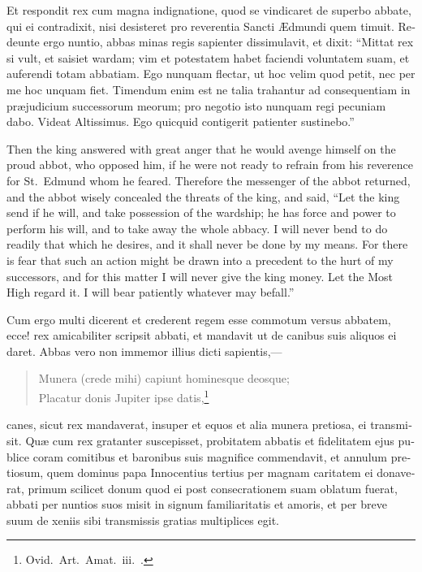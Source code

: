 \documentclass[10pt]{book}
\begin{document}
\begin{paracol}{2}
\switchcolumn*

\begin{otherlanguage}{latin}
Et respondit rex cum magna indignatione, quod se vindicaret de superbo abbate, qui ei contradixit, nisi desisteret pro reverentia Sancti \AE{}dmundi quem timuit. Redeunte ergo nuntio, abbas minas regis sapienter dissimulavit, et dixit: ``Mittat rex si vult, et saisiet wardam; vim et potestatem habet faciendi voluntatem suam, et auferendi totam abbatiam. Ego nunquam flectar, ut hoc velim quod petit, nec per me hoc unquam fiet. Timendum enim est ne talia trahantur ad consequentiam in pr\ae{}judicium successorum meorum; pro negotio isto nunquam regi pecuniam dabo. Videat Altissimus. Ego quicquid contigerit patienter sustinebo.''
\end{otherlanguage}

\switchcolumn

Then the king answered with great anger that he would avenge himself on the proud abbot, who opposed him, if he were not ready to refrain from his reverence for St.\ Edmund whom he feared. Therefore the messenger of the abbot returned, and the abbot wisely concealed the threats of the king, and said, ``Let the king send if he will, and take possession of the wardship; he has force and power to perform his will, and to take away the whole abbacy. I will never bend to do readily that which he desires, and it shall never be done by my means. For there is fear that such an action might be drawn into a precedent to the hurt of my successors, and for this matter I will never give the king money. Let the Most High regard it. I will bear patiently whatever may befall.''

\switchcolumn*

\begin{otherlanguage}{latin}
Cum ergo multi dicerent et crederent regem esse commotum versus abbatem, ecce! rex amicabiliter scripsit abbati, et mandavit ut de canibus suis aliquos ei daret. Abbas vero non immemor illius dicti sapientis,---
\vspace{-.2cm}
\begin{verse}
{\footnotesize
Munera (crede mihi) capiunt hominesque deosque;\\
Placatur donis Jupiter ipse datis,\footnote[\textdagger]{Ovid.\ Art.\ Amat.\ iii.\ .}
}
\end{verse}
\vspace{-.2cm}
canes, sicut rex mandaverat, insuper et equos et alia munera pretiosa, ei transmisit. Qu\ae{} cum rex gratanter suscepisset, probitatem abbatis et fidelitatem ejus publice coram comitibus et baronibus suis magnifice commendavit, et annulum pretiosum, quem dominus papa Innocentius tertius per magnam caritatem ei donaverat, primum scilicet donum quod ei post consecrationem suam oblatum fuerat, abbati per nuntios suos misit in signum familiaritatis et amoris, et per breve suum de xeniis sibi transmissis gratias multiplices egit.
\end{otherlanguage}


\end{paracol}
\end{document}
